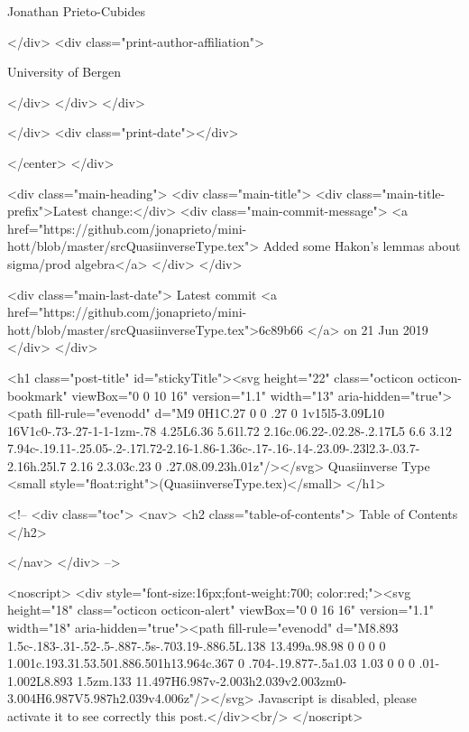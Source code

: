                   Jonathan Prieto-Cubides
                
              </div>
              <div class="print-author-affiliation">
                
                  University of Bergen
                
                </div>
            </div>
          </div>
          
          
        </div>
        <div class="print-date"></div>
        
        
    </center>
  </div>

  
  <div class="main-heading">
    <div class="main-title">
      <div class="main-title-prefix">Latest change:</div>
      <div class="main-commit-message">
            <a href="https://github.com/jonaprieto/mini-hott/blob/master/srcQuasiinverseType.tex">
              Added some Hakon's lemmas about sigma/prod algebra</a>
      </div>
    </div>

    <div class="main-last-date">
      Latest commit <a href="https://github.com/jonaprieto/mini-hott/blob/master/srcQuasiinverseType.tex">6c89b66 </a> on  21 Jun 2019
    </div>
  </div>
  

  <h1 class="post-title" id="stickyTitle"><svg height="22" class="octicon octicon-bookmark" viewBox="0 0 10 16" version="1.1" width="13" aria-hidden="true"><path fill-rule="evenodd" d="M9 0H1C.27 0 0 .27 0 1v15l5-3.09L10 16V1c0-.73-.27-1-1-1zm-.78 4.25L6.36 5.61l.72 2.16c.06.22-.02.28-.2.17L5 6.6 3.12 7.94c-.19.11-.25.05-.2-.17l.72-2.16-1.86-1.36c-.17-.16-.14-.23.09-.23l2.3-.03.7-2.16h.25l.7 2.16 2.3.03c.23 0 .27.08.09.23h.01z"/></svg> Quasiinverse Type <small style="float:right">(QuasiinverseType.tex)</small>
  </h1>

  <!-- 
  <div class="toc">
    <nav>
    <h2 class="table-of-contents"> Table of Contents </h2>
      

    </nav>
  </div>
   -->

  <noscript>
  <div style="font-size:16px;font-weight:700; color:red;"><svg height="18" class="octicon octicon-alert" viewBox="0 0 16 16" version="1.1" width="18" aria-hidden="true"><path fill-rule="evenodd" d="M8.893 1.5c-.183-.31-.52-.5-.887-.5s-.703.19-.886.5L.138 13.499a.98.98 0 0 0 0 1.001c.193.31.53.501.886.501h13.964c.367 0 .704-.19.877-.5a1.03 1.03 0 0 0 .01-1.002L8.893 1.5zm.133 11.497H6.987v-2.003h2.039v2.003zm0-3.004H6.987V5.987h2.039v4.006z"/></svg> Javascript is disabled, please activate it to see correctly this post.</div><br/>
  </noscript>


